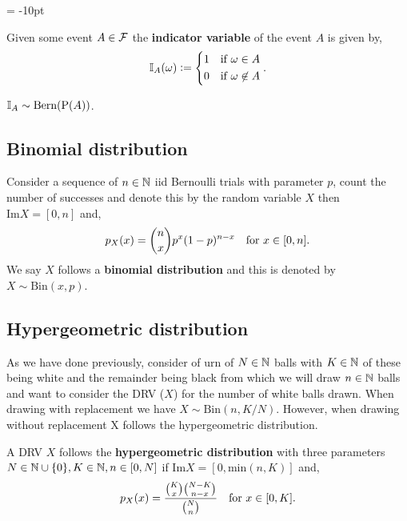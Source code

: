 \begingroup\belowdisplayskip = -10pt
\begin{definition}
    Given some event $A\in\mathcal{F}$ the \textbf{indicator variable} of the event $A$ is given by,\[
    \mathbb{I}_A(\omega) := \begin{dcases}
        1 & \text{\textcolor{black}{if }} \omega \in A \\
        0 & \text{\textcolor{black}{if }} \omega \not\in A
    \end{dcases}
    \textcolor{black}{.}
    \]
\end{definition}
\endgroup

\begin{remark}
    $\mathbb{I}_A \sim \text{Bern}(\mathrm{P}(A))$.
\end{remark}

\subsection{Binomial distribution}
\begin{definition}
    Consider a sequence of $n\in\mathbb{N}$ iid Bernoulli trials with parameter $p$, count the number of successes and denote this by the random variable $X$ then $\text{Im}X = [0,n]$ and, \[p_X(x) = \binom{n}{x}p^x(1-p)^{n-x} \quad \text{\textcolor{black}{for }$x\in[0,n]$}\textcolor{black}{.}\]
We say $X$ follows a \textbf{binomial distribution} and this is denoted by $X \sim \text{Bin}(x,p)$.
\end{definition}

\subsection{Hypergeometric distribution}
As we have done previously, consider of urn of $N\in\mathbb{N}$ balls with $K\in\mathbb{N}$ of these being white and the remainder being black from which we will draw $n\in\mathbb{N}$ balls and want to consider the DRV ($X$) for the number of white balls drawn. When drawing with replacement we have $X \sim \text{Bin}(n,K/N)$. However, when drawing without replacement X follows the hypergeometric distribution.

\begin{definition}
    A DRV $X$ follows the \textbf{hypergeometric distribution} with three parameters $N\in\mathbb{N}\cup\{0\}, K\in\mathbb{N},n\in[0,N]$ if $\text{Im}X = [0,\text{min}(n,K)]$ and, \[
        p_X(x) = \frac{\binom{K}{x}\binom{N-K}{n-x}}{\binom{N}{n}} \quad \text{\textcolor{black}{for }$x\in[0,K]$}\textcolor{black}{.}
    \]
\end{definition}

\begin{lemma}
    
\end{lemma}


